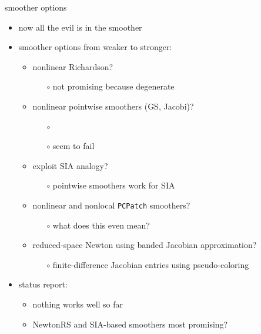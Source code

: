 \documentclass[usepdftitle=false,usenames,dvipsnames]{beamer}
\begin{document}
\begin{frame}{smoother options}

\begin{itemize}
\item now all the evil is in the smoother
\item smoother options from weaker to stronger:
    \begin{itemize}
    \item nonlinear Richardson?
        \begin{itemize}
        \item[{\color{black} $\circ$}] not promising because degenerate
        \end{itemize}
    \item nonlinear pointwise smoothers (GS, Jacobi)?
        \begin{itemize}
        \item[{\color{black} $\circ$}]  
        \item[{\color{black} $\circ$}] seem to fail
        \end{itemize}
    \item exploit SIA analogy?
        \begin{itemize}
        \item[{\color{black} $\circ$}] pointwise smoothers work for SIA
        \end{itemize}
    \item nonlinear and nonlocal \texttt{PCPatch} smoothers?
        \begin{itemize}
        \item[{\color{black} $\circ$}] what does this even mean?
        \end{itemize}
    \item reduced-space Newton using banded Jacobian approximation?
        \begin{itemize}
        \item[{\color{black} $\circ$}] finite-difference Jacobian entries using pseudo-coloring
        \end{itemize}
    \end{itemize}

\medskip
\item<2> status report:
    \begin{itemize}
    \item \alert{nothing works well so far}
    \item NewtonRS and SIA-based smoothers most promising?
    \end{itemize}
\end{itemize}
\end{frame}
\end{document}
